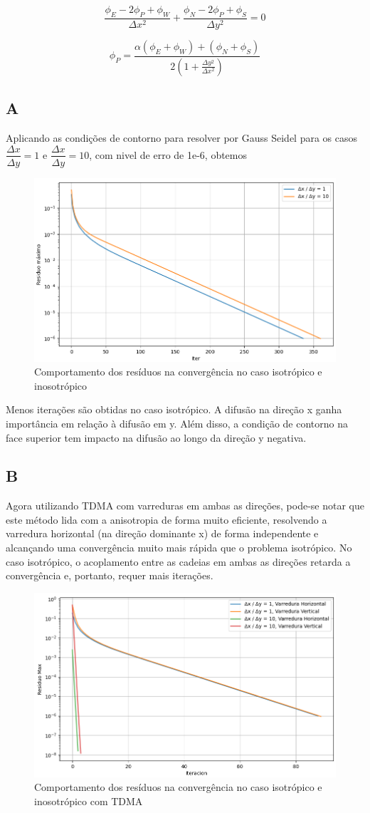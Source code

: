 \documentclass[]{article}
\begin{document}
\begin{equation}
	\frac{\phi_{E} - 2\phi_{P} + \phi_{W}}{\Delta x^2} +
	\frac{\phi_{N} - 2\phi_{P} + \phi_{S}}{\Delta y^2} = 0
\end{equation}

\begin{equation}
	\phi_P = \frac{\alpha (\phi_{E} + \phi_{W}) + (\phi_{N} + \phi_{S})}{2(1 + \frac{\Delta y^{2}}{\Delta x^{2}})}
\end{equation}

\subsection*{A}

Aplicando as condições de contorno para resolver por Gauss Seidel para os casos $\dfrac{\Delta x}{\Delta y} = 1 $ e $\dfrac{\Delta x}{\Delta y} = 10 $, com nivel de erro de 1e-6, obtemos

\begin{figure}[H]
	\centering
	\includegraphics[width=.65\textwidth]{figures/5-1}
	\caption{Comportamento dos resíduos na convergência no caso isotrópico e inosotrópico}
\end{figure}

Menos iterações são obtidas no caso isotrópico. A difusão na direção x ganha importância em relação à difusão em y. Além disso, a condição de contorno na face superior tem impacto na difusão ao longo da direção y negativa.


\subsection*{B}
Agora utilizando TDMA com varreduras em ambas as direções, pode-se notar que este método lida com a anisotropia de forma muito eficiente, resolvendo a varredura horizontal (na direção dominante x) de forma independente e alcançando uma convergência muito mais rápida que o problema isotrópico. No caso isotrópico, o acoplamento entre as cadeias em ambas as direções retarda a convergência e, portanto, requer mais iterações.


\begin{figure}[H]
	\centering
	\includegraphics[width=.65\textwidth]{figures/5-2}
	\caption{Comportamento dos resíduos na convergência no caso isotrópico e inosotrópico com TDMA}
\end{figure}
\end{document}
